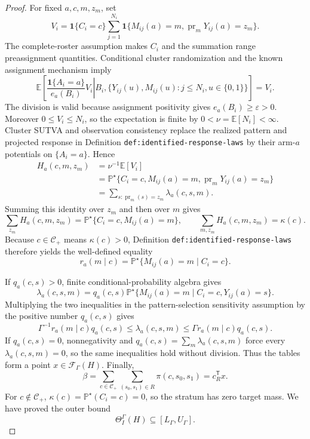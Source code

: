 \documentclass{article}
\begin{document}
\begin{proof}
For fixed \(a,c,m,z_m\), set
\[
V_i=\mathbf 1\{C_i=c\}\sum_{j=1}^{N_i}
 \mathbf 1\{M_{ij}(a)=m,\operatorname{pr}_mY_{ij}(a)=z_m\}.
\]
The complete-roster assumption makes \(C_i\) and the summation range preassignment quantities.  Conditional cluster randomization and the known assignment mechanism imply
\[
\mathbb E\!\left[
 \left.\frac{\mathbf 1\{A_i=a\}}{e_a(B_i)}V_i
 \right|B_i,\{Y_{ij}(u),M_{ij}(u):j\leq N_i,u\in\{0,1\}\}\right]=V_i.
\]
The division is valid because assignment positivity gives \(e_a(B_i)\geq\varepsilon>0\).  Moreover \(0\leq V_i\leq N_i\), so the expectation is finite by \(0<\nu=\mathbb E[N_i]<\infty\).  Cluster SUTVA and observation consistency replace the realized pattern and projected response in Definition \texttt{def:identified-response-laws} by their arm-\(a\) potentials on \(\{A_i=a\}\).  Hence
\[
\begin{aligned}
H_a(c,m,z_m)
 &=\nu^{-1}\mathbb E[V_i]\\
 &=\mathbb P^{\star}\{C_i=c,M_{ij}(a)=m,
      \operatorname{pr}_mY_{ij}(a)=z_m\}\\
 &=\sum_{s:\operatorname{pr}_m(s)=z_m}\lambda_a(c,s,m).
\end{aligned}
\]
Summing this identity over \(z_m\) and then over \(m\) gives
\[
\sum_{z_m}H_a(c,m,z_m)
 =\mathbb P^{\star}\{C_i=c,M_{ij}(a)=m\},
\qquad
\sum_{m,z_m}H_a(c,m,z_m)=\kappa(c).
\]
Because \(c\in\mathcal C_+\) means \(\kappa(c)>0\), Definition \texttt{def:identified-response-laws} therefore yields the well-defined equality
\[
r_a(m\mid c)=\mathbb P^{\star}\{M_{ij}(a)=m\mid C_i=c\}.
\]

If \(q_a(c,s)>0\), finite conditional-probability algebra gives
\[
\lambda_a(c,s,m)
=q_a(c,s)\mathbb P^{\star}\{M_{ij}(a)=m\mid C_i=c,Y_{ij}(a)=s\}.
\]
Multiplying the two inequalities in the pattern-selection sensitivity assumption by the positive number \(q_a(c,s)\) gives
\[
\Gamma^{-1}r_a(m\mid c)q_a(c,s)
\leq\lambda_a(c,s,m)
\leq\Gamma r_a(m\mid c)q_a(c,s).
\]
If \(q_a(c,s)=0\), nonnegativity and \(q_a(c,s)=\sum_m\lambda_a(c,s,m)\) force every \(\lambda_a(c,s,m)=0\), so the same inequalities hold without division.  Thus the tables form a point \(x\in\mathcal F_{\Gamma}(H)\).  Finally,
\[
\beta
=\sum_{c\in\mathcal C_+}\sum_{(s_0,s_1)\in R}\pi(c,s_0,s_1)
=c_R^{\mathsf T}x.
\]
For \(c\notin\mathcal C_+\), \(\kappa(c)=\mathbb P^{\star}(C_i=c)=0\), so the stratum has zero target mass.  We have proved the outer bound
\[
\Theta_I^{\Gamma}(H)\subseteq[L_{\Gamma},U_{\Gamma}].
\]


\end{proof}
\end{document}
